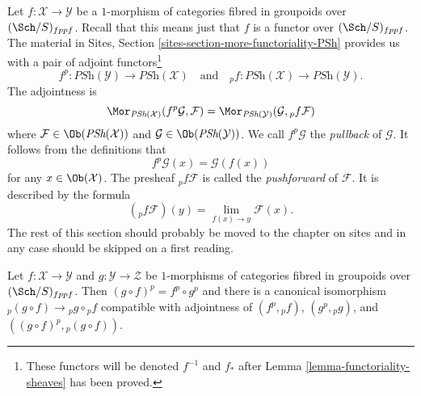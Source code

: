 \medskip\noindent
Let $f : \mathcal{X} \to \mathcal{Y}$ be a $1$-morphism of categories
fibred in groupoids over $(\Sch/S)_{fppf}$. Recall that this
means just that $f$ is a functor over $(\Sch/S)_{fppf}$.
The material in
Sites, Section \ref{sites-section-more-functoriality-PSh}
provides us with a pair of adjoint functors\footnote{These functors
will be denoted $f^{-1}$ and $f_*$ after
Lemma \ref{lemma-functoriality-sheaves}
has been proved.}
\begin{equation}
\label{equation-pushforward-pullback}
f^p : \textit{PSh}(\mathcal{Y}) \longrightarrow \textit{PSh}(\mathcal{X})
\quad\text{and}\quad
{}_pf : \textit{PSh}(\mathcal{X}) \longrightarrow \textit{PSh}(\mathcal{Y}).
\end{equation}
The adjointness is
$$
\Mor_{\textit{PSh}(\mathcal{X})}(f^p\mathcal{G}, \mathcal{F})
=
\Mor_{\textit{PSh}(\mathcal{Y})}(\mathcal{G}, {}_pf\mathcal{F})
$$
where $\mathcal{F} \in \Ob(\textit{PSh}(\mathcal{X}))$ and
$\mathcal{G} \in \Ob(\textit{PSh}(\mathcal{Y}))$. We call
$f^p\mathcal{G}$ the {\it pullback} of $\mathcal{G}$. It follows
from the definitions that
$$
f^p\mathcal{G}(x) = \mathcal{G}(f(x))
$$
for any $x \in \Ob(\mathcal{X})$. The presheaf ${}_pf\mathcal{F}$
is called the {\it pushforward} of $\mathcal{F}$. It is described
by the formula
$$
({}_pf\mathcal{F})(y) = \lim_{f(x) \to y} \mathcal{F}(x).
$$
The rest of this section should probably be moved to the chapter
on sites and in any case should be skipped on a first reading.

\begin{lemma}
\label{lemma-1-morphisms-presheaves}
Let $f : \mathcal{X} \to \mathcal{Y}$ and $g : \mathcal{Y} \to \mathcal{Z}$
be $1$-morphisms of categories fibred in groupoids over
$(\Sch/S)_{fppf}$. Then $(g \circ f)^p = f^p \circ g^p$ and
there is a canonical isomorphism
${}_p(g \circ f) \to {}_pg \circ {}_pf$
compatible with adjointness of $(f^p, {}_pf)$, $(g^p, {}_pg)$, and
$((g \circ f)^p, {}_p(g \circ f))$.
\end{lemma}


